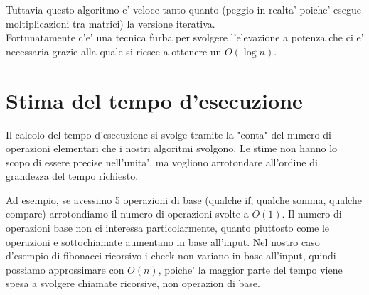 \documentclass{article}
\begin{document}
Tuttavia questo algoritmo e' veloce tanto quanto (peggio in realta' poiche' esegue moltiplicazioni tra matrici) la versione iterativa. \\
Fortunatamente c'e' una tecnica furba per svolgere l'elevazione a potenza che ci e' necessaria grazie alla quale si riesce a ottenere un $O(\log n)$.

\section{Stima del tempo d'esecuzione}

Il calcolo del tempo d'esecuzione si svolge tramite la "conta" del numero di operazioni elementari che i nostri algoritmi svolgono.
Le stime non hanno lo scopo di essere precise nell'unita', ma vogliono arrotondare all'ordine di grandezza del tempo richiesto.

Ad esempio, se avessimo 5 operazioni di base (qualche if, qualche somma, qualche compare) arrotondiamo il numero di operazioni svolte a $O(1)$.
Il numero di operazioni base non ci interessa particolarmente, quanto piuttosto come le operazioni e sottochiamate aumentano in base all'input.
Nel nostro caso d'esempio di fibonacci ricorsivo i check non variano in base all'input, quindi possiamo approssimare con $O(n)$, poiche' la maggior parte del tempo viene spesa a svolgere chiamate ricorsive, non operazion di base.
\end{document}
